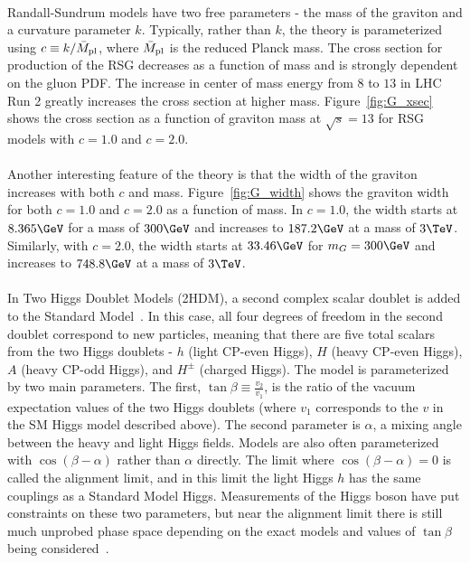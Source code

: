 \paragraph{}
Randall-Sundrum models have two free parameters - the mass of the graviton and a curvature parameter $k$. Typically, rather than $k$, the theory is parameterized using $c \equiv k/\bar{M}_{\rm pl}$, where $\bar{M}_{\rm pl}$ is the reduced Planck mass. The cross section for production of the RSG decreases as a function of mass and is strongly dependent on the gluon PDF. The increase in center of mass energy from $8$ to $13$ \TeV in LHC Run 2 greatly increases the cross section at higher mass. Figure~\ref{fig:G_xsec} shows the cross section as a function of graviton mass at $\sqrt{s} = 13$ \TeV for RSG models with $c=1.0$ and $c=2.0$. 

\paragraph{}
Another interesting feature of the theory is that the width of the graviton increases with both $c$ and mass. Figure~\ref{fig:G_width} shows the graviton width for both $c=1.0$ and $c=2.0$ as a function of mass. In $c=1.0$, the width starts at $8.365 \GeV$ for a mass of $300 \GeV$ and increases to $187.2 \GeV$ at a mass of $3 \TeV$. Similarly, with $c=2.0$, the width starts at $33.46 \GeV$ for $m_G = 300 \GeV$ and increases to $748.8 \GeV$ at a mass of $3 \TeV$. 

\paragraph{}
In Two Higgs Doublet Models (2HDM), a second complex scalar doublet is added to the Standard Model~\cite{HH_2HDM,2HDM2,2HDM3}. In this case, all four degrees of freedom in the second doublet correspond to new particles, meaning that there are five total scalars from the two Higgs doublets - $h$ (light CP-even Higgs), $H$ (heavy CP-even Higgs), $A$ (heavy CP-odd Higgs), and $H^{\pm}$ (charged Higgs). The model is parameterized by two main parameters. The first, $\tan{\beta} \equiv \frac{v_2}{v_1}$, is the ratio of the vacuum expectation values of the two Higgs doublets (where $v_1$ corresponds to the $v$ in the SM Higgs model described above). The second parameter is $\alpha$, a mixing angle between the heavy and light Higgs fields. Models are also often parameterized with $\cos(\beta - \alpha)$ rather than $\alpha$ directly. The limit where $\cos(\beta - \alpha) = 0$ is called the alignment limit, and in this limit the light Higgs $h$ has the same couplings as a Standard Model Higgs. Measurements of the Higgs boson have put constraints on these two parameters, but near the alignment limit there is still much unprobed phase space depending on the exact models and values of $\tan{\beta}$ being considered~\cite{HiggsNewPhysics}.

